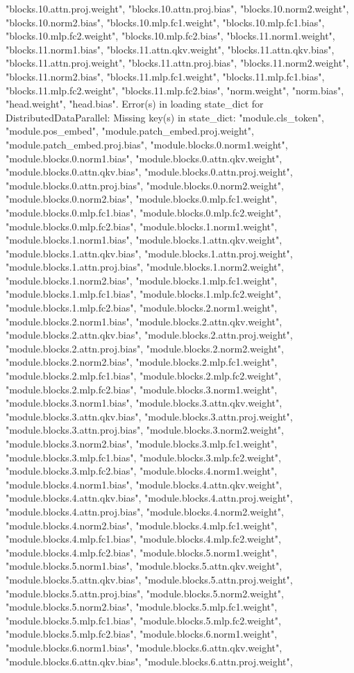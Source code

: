 "blocks.10.attn.proj.weight", "blocks.10.attn.proj.bias", "blocks.10.norm2.weight", "blocks.10.norm2.bias", "blocks.10.mlp.fc1.weight", "blocks.10.mlp.fc1.bias", "blocks.10.mlp.fc2.weight", "blocks.10.mlp.fc2.bias", "blocks.11.norm1.weight", "blocks.11.norm1.bias", "blocks.11.attn.qkv.weight", "blocks.11.attn.qkv.bias", "blocks.11.attn.proj.weight", "blocks.11.attn.proj.bias", "blocks.11.norm2.weight", "blocks.11.norm2.bias", "blocks.11.mlp.fc1.weight", "blocks.11.mlp.fc1.bias", "blocks.11.mlp.fc2.weight", "blocks.11.mlp.fc2.bias", "norm.weight", "norm.bias", "head.weight", "head.bias". Error(s) in loading state_dict for DistributedDataParallel:
	Missing key(s) in state_dict: "module.cls_token", "module.pos_embed", "module.patch_embed.proj.weight", "module.patch_embed.proj.bias", "module.blocks.0.norm1.weight", "module.blocks.0.norm1.bias", "module.blocks.0.attn.qkv.weight", "module.blocks.0.attn.qkv.bias", "module.blocks.0.attn.proj.weight", "module.blocks.0.attn.proj.bias", "module.blocks.0.norm2.weight", "module.blocks.0.norm2.bias", "module.blocks.0.mlp.fc1.weight", "module.blocks.0.mlp.fc1.bias", "module.blocks.0.mlp.fc2.weight", "module.blocks.0.mlp.fc2.bias", "module.blocks.1.norm1.weight", "module.blocks.1.norm1.bias", "module.blocks.1.attn.qkv.weight", "module.blocks.1.attn.qkv.bias", "module.blocks.1.attn.proj.weight", "module.blocks.1.attn.proj.bias", "module.blocks.1.norm2.weight", "module.blocks.1.norm2.bias", "module.blocks.1.mlp.fc1.weight", "module.blocks.1.mlp.fc1.bias", "module.blocks.1.mlp.fc2.weight", "module.blocks.1.mlp.fc2.bias", "module.blocks.2.norm1.weight", "module.blocks.2.norm1.bias", "module.blocks.2.attn.qkv.weight", "module.blocks.2.attn.qkv.bias", "module.blocks.2.attn.proj.weight", "module.blocks.2.attn.proj.bias", "module.blocks.2.norm2.weight", "module.blocks.2.norm2.bias", "module.blocks.2.mlp.fc1.weight", "module.blocks.2.mlp.fc1.bias", "module.blocks.2.mlp.fc2.weight", "module.blocks.2.mlp.fc2.bias", "module.blocks.3.norm1.weight", "module.blocks.3.norm1.bias", "module.blocks.3.attn.qkv.weight", "module.blocks.3.attn.qkv.bias", "module.blocks.3.attn.proj.weight", "module.blocks.3.attn.proj.bias", "module.blocks.3.norm2.weight", "module.blocks.3.norm2.bias", "module.blocks.3.mlp.fc1.weight", "module.blocks.3.mlp.fc1.bias", "module.blocks.3.mlp.fc2.weight", "module.blocks.3.mlp.fc2.bias", "module.blocks.4.norm1.weight", "module.blocks.4.norm1.bias", "module.blocks.4.attn.qkv.weight", "module.blocks.4.attn.qkv.bias", "module.blocks.4.attn.proj.weight", "module.blocks.4.attn.proj.bias", "module.blocks.4.norm2.weight", "module.blocks.4.norm2.bias", "module.blocks.4.mlp.fc1.weight", "module.blocks.4.mlp.fc1.bias", "module.blocks.4.mlp.fc2.weight", "module.blocks.4.mlp.fc2.bias", "module.blocks.5.norm1.weight", "module.blocks.5.norm1.bias", "module.blocks.5.attn.qkv.weight", "module.blocks.5.attn.qkv.bias", "module.blocks.5.attn.proj.weight", "module.blocks.5.attn.proj.bias", "module.blocks.5.norm2.weight", "module.blocks.5.norm2.bias", "module.blocks.5.mlp.fc1.weight", "module.blocks.5.mlp.fc1.bias", "module.blocks.5.mlp.fc2.weight", "module.blocks.5.mlp.fc2.bias", "module.blocks.6.norm1.weight", "module.blocks.6.norm1.bias", "module.blocks.6.attn.qkv.weight", "module.blocks.6.attn.qkv.bias", "module.blocks.6.attn.proj.weight", 